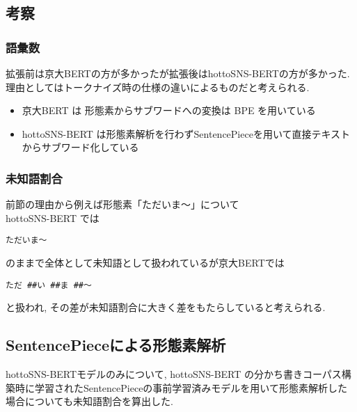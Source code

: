 \documentclass[twocolumn]{jarticle}     %
\begin{document}
\subsection{考察}
\subsubsection{語彙数}
拡張前は京大BERTの方が多かったが拡張後はhottoSNS-BERTの方が多かった.
理由としてはトークナイズ時の仕様の違いによるものだと考えられる.
\begin{itemize}
  \item 京大BERT は 形態素からサブワードへの変換は BPE を用いている
  \item hottoSNS-BERT は形態素解析を行わずSentencePieceを用いて直接テキストからサブワード化している
\end{itemize}
\subsubsection{未知語割合}
前節の理由から例えば形態素「ただいま～」について\\
hottoSNS-BERT では
\begin{verbatim}
ただいま～
\end{verbatim}
のままで全体として未知語として扱われているが京大BERTでは
\begin{verbatim}
ただ ##い ##ま ##〜
\end{verbatim}
と扱われ, その差が未知語割合に大きく差をもたらしていると考えられる.

\subsection{SentencePieceによる形態素解析}
hottoSNS-BERTモデルのみについて, hottoSNS-BERT の分かち書きコーパス構築時に学習されたSentencePieceの事前学習済みモデルを用いて形態素解析した場合についても未知語割合を算出した.
\end{document}
